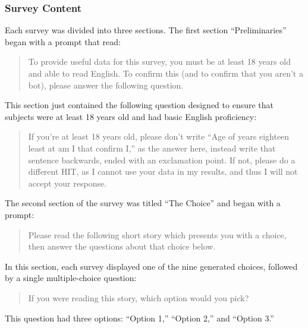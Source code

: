\subsubsection{Survey Content}

Each survey was divided into three sections.
%
The first section ``Preliminaries'' began with a prompt that read:
\begin{quote}
  \quoteshape
To provide useful data for this survey, you must be at least 18 years old and able to read English. To confirm this (and to confirm that you aren't a bot), please answer the following question.
\end{quote}
%
This section just contained the following question designed to ensure that subjects were at least 18 years old and had basic English proficiency:
%
\begin{quote}
  \quoteshape
If you're at least 18 years old, please don't write ``Age of years eighteen least at am I that confirm I,'' as the answer here, instead write that sentence backwards, ended with an exclamation point. If not, please do a different HIT, as I cannot use your data in my results, and thus I will not accept your response.
\end{quote}


The second section of the survey was titled ``The Choice'' and began with a prompt:
%
\begin{quote}
  \quoteshape
Please read the following short story which presents you with a choice, then answer the questions about that choice below.
\end{quote}
%
In this section, each survey displayed one of the nine generated choices, followed by a single multiple-choice question:
%
\begin{quote}
  \quoteshape
If you were reading this story, which option would you pick?
\end{quote}
%
This question had three options: ``Option 1,'' ``Option 2,'' and ``Option 3.''


